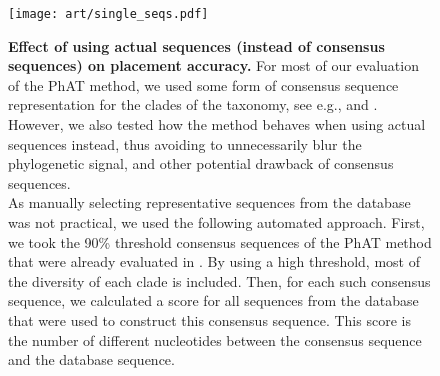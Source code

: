 
\begin{figure}[hpbt]
    \centering
    \texttt{[image: art/single\_seqs.pdf]}
    \begin{subfigure}{0pt}
        \label{fig:single_seqs:sub:majorities_edge}
    \end{subfigure}
    \begin{subfigure}{0pt}
        \label{fig:single_seqs:sub:single_seq_edge}
    \end{subfigure}
    \begin{subfigure}{0pt}
        \label{fig:single_seqs:sub:majorities_branch}
    \end{subfigure}
    \begin{subfigure}{0pt}
        \label{fig:single_seqs:sub:single_seq_branch}
    \end{subfigure}
    \caption[Effect of using actual sequences (instead of consensus sequences) on placement accuracy]{
        \textbf{Effect of using actual sequences (instead of consensus sequences) on placement accuracy.}
        For most of our evaluation of the \ac{PhAT} method,
        we used some form of consensus sequence representation for the clades of the taxonomy,
        see e.g.,  and .
        However, we also tested how the method behaves when using actual sequences instead,
        thus avoiding to unnecessarily blur the phylogenetic signal,
        and other potential drawback of consensus sequences.
        \\
        As manually selecting representative sequences from the database was not practical,
        we used the following automated approach.
        First, we took the 90\% threshold consensus sequences of the \ac{PhAT} method
        that were already evaluated in .
        By using a high threshold, most of the diversity of each clade is included.
        Then, for each such consensus sequence,
        we calculated a score for all sequences from the database that were used to construct this consensus sequence.
        This score is the number of different nucleotides between the consensus sequence and the database sequence.
}
\end{figure}
